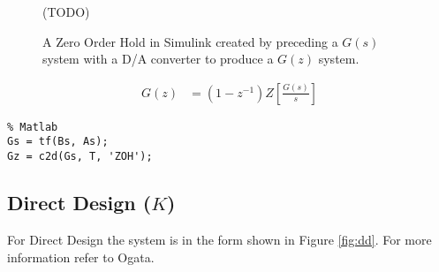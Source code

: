 \documentclass{article}
\newcommand{\sincludepdf}[2][]{
	
}
\begin{document}
\begin{figure}
(TODO)
\caption{A Zero Order Hold in Simulink created by preceding
a $G(s)$ system with a D/A converter to produce a $G(z)$ system.}
\label{fig:simulinkzoh}
\end{figure}

\begin{align}
	G(z) &= (1 - z^{-1}) Z \left[ \frac{G(s)}{s} \right]
\end{align}

\begin{lstlisting}
% Matlab
Gs = tf(Bs, As);
Gz = c2d(Gs, T, 'ZOH');
\end{lstlisting}

\sincludepdf[pages={8},
			pagecommand=\paragraph{Example 1}
	]{scan/11211301.pdf}

\sincludepdf[pages={6},
			pagecommand=\subsubsection*{Example 2}
		]{scan/11221301.pdf}
\sincludepdf[pages={7}]{scan/11221301.pdf}

\sincludepdf[pages={1},
			pagecommand=\subsubsection*{Example 3}
		]{scan/11221301.pdf}
\sincludepdf[pages={2}]{scan/11221301.pdf}



\clearpage
\subsection{Direct Design ($K$)}
\label{sec:dd}

For Direct Design the system is in the form shown in Figure \ref{fig:dd}.
For more information refer to Ogata\autocite[Pg. 517]{ogata1995discrete}.
\end{document}

